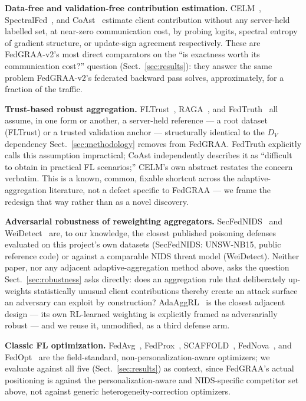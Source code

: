 \documentclass{llncs}
\begin{document}
\textbf{Data-free and validation-free contribution estimation.} CELM~\cite{CELM}, SpectralFed~\cite{SpectralFed}, and CoAst~\cite{CoAst} estimate client contribution without any server-held labelled set, at near-zero communication cost, by probing logits, spectral entropy of gradient structure, or update-sign agreement respectively. These are FedGRAA-v2's most direct comparators on the ``is exactness worth its communication cost?'' question (Sect.~\ref{sec:results}): they answer the same problem FedGRAA-v2's federated backward pass solves, approximately, for a fraction of the traffic.

\textbf{Trust-based robust aggregation.} FLTrust~\cite{FLTrust}, RAGA~\cite{RAGA}, and FedTruth~\cite{FedTruth} all assume, in one form or another, a server-held reference --- a root dataset (FLTrust) or a trusted validation anchor --- structurally identical to the $D_V$ dependency Sect.~\ref{sec:methodology} removes from FedGRAA. FedTruth explicitly calls this assumption impractical; CoAst independently describes it as ``difficult to obtain in practical FL scenarios;'' CELM's own abstract restates the concern verbatim. This is a known, common, fixable shortcut across the adaptive-aggregation literature, not a defect specific to FedGRAA --- we frame the redesign that way rather than as a novel discovery.

\textbf{Adversarial robustness of reweighting aggregators.} SecFedNIDS~\cite{SecFedNIDS} and WeiDetect~\cite{WeiDetect} are, to our knowledge, the closest published poisoning defenses evaluated on this project's own datasets (SecFedNIDS: UNSW-NB15, public reference code) or against a comparable NIDS threat model (WeiDetect). Neither paper, nor any adjacent adaptive-aggregation method above, asks the question Sect.~\ref{sec:robustness} asks directly: does an aggregation rule that deliberately up-weights statistically unusual client contributions thereby create an attack surface an adversary can exploit by construction? AdaAggRL~\cite{AdaAggRL} is the closest adjacent design --- its own RL-learned weighting is explicitly framed as adversarially robust --- and we reuse it, unmodified, as a third defense arm.

\textbf{Classic FL optimization.} FedAvg~\cite{FedAvg}, FedProx~\cite{FedProx}, SCAFFOLD~\cite{SCAFFOLD}, FedNova~\cite{FedNova}, and FedOpt~\cite{FedOpt} are the field-standard, non-personalization-aware optimizers; we evaluate against all five (Sect.~\ref{sec:results}) as context, since FedGRAA's actual positioning is against the personalization-aware and NIDS-specific competitor set above, not against generic heterogeneity-correction optimizers.
\end{document}
